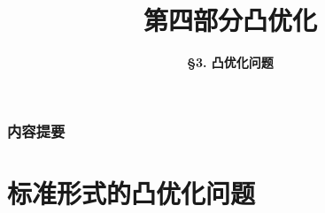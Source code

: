 



\title[Convex Optimization]{\LARGE \bfseries 第四部分\quad 凸优化} %
\author[Convex Optimization Problems] %
{\Large \bfseries \S 3. 凸优化问题}
\date{}






\begin{frame}

\titlepage %

\end{frame}


\begin{frame}
\frametitle{内容提要} %
\tableofcontents %
\end{frame}


\section{标准形式的凸优化问题}


